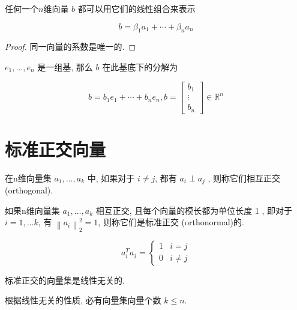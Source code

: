 \begin{definition}
    任何一个$n$维向量 $ b $ 都可以用它们的线性组合来表示

$$
b=\beta_{1} a_{1}+\cdots+\beta_{n} a_{n}
$$
\end{definition}

\begin{proof}
    同一向量的系数是唯一的. 
\end{proof}

\begin{example}
    $ e_{1}, \ldots, e_{n} $ 是一组基, 那么 $ b $ 在此基底下的分解为

    $$ b=b_{1} e_{1}+\cdots+b_{n} e_{n} ,b=\left[\begin{array}{c}b_{1} \\ \vdots \\ b_{n}\end{array}\right] \in \mathbb{R}^{n} $$
\end{example}

\section{标准正交向量}

\begin{definition}
    \label{Def:OrthogonalVectors}
    在n维向量集 $ a_{1}, \ldots, a_{k} $ 中,  如果对于 $ i \neq j $, 都有 $ a_{i} \perp a_{j} $ ,  则称它们相互正交(orthogonal). 
\end{definition}

\begin{definition}
    \label{Def:OrthonormalVectors}
    如果n维向量集 $ a_{1}, \ldots, a_{k} $ 相互正交, 且每个向量的模长都为单位长度 1 ,  即对于 $ i=1, \ldots k $, 有 $ \left\|a_{i}\right\|_{2}^{2}=1 $, 则称它们是标准正交 (orthonormal)的. 

    $$ a_{i}^{T} a_{j}=\left\{\begin{array}{ll}1 & i=j \\ 0 & i \neq j\end{array}\right. $$
\end{definition}

\begin{corollary}
    标准正交的向量集是线性无关的. 
\end{corollary}

\begin{corollary}
    根据线性无关的性质, 必有向量集向量个数 $ k \leq n $.
\end{corollary}

